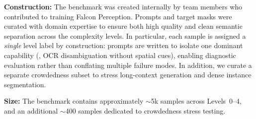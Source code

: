 \noindent \textbf{Construction:} The benchmark was created internally by team members who contributed to training Falcon Perception. Prompts and target masks were curated with domain expertise to ensure both high quality and clean semantic separation across the complexity levels. In particular, each sample is assigned a \emph{single} level label by construction: prompts are written to isolate one dominant capability (\eg, OCR disambiguation without spatial cues), enabling diagnostic evaluation rather than conflating multiple failure modes. In addition, we curate a separate crowdedness subset to stress long-context generation and dense instance segmentation.

\noindent \textbf{Size:} The benchmark contains approximately $\sim$5k samples  across Levels~0--4, and an additional $\sim$400 samples dedicated to crowdedness stress testing.
